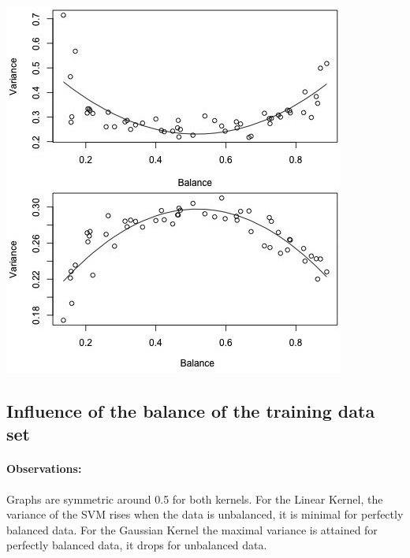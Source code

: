 \documentclass[a1,portrait]{a0poster}
\begin{document}
\begin{multicols}{3}
\begin{center}\vspace{1cm}
\includegraphics[width=1\linewidth]{abb/balance.jpg}

\label{fig5}
\end{center}\vspace{1cm}



\subsection*{Influence of the balance of the training data set}

\paragraph{Observations:}
Graphs are symmetric around 0.5 for both kernels. For the Linear Kernel, the variance of the SVM rises when the data is unbalanced, it is minimal for perfectly balanced data. For the Gaussian Kernel the maximal variance is attained for perfectly balanced data, it drops for unbalanced data. 

\end{multicols}
\end{document}
